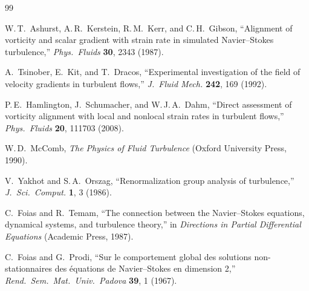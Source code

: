 \documentclass[12pt,a4paper]{article}
\begin{document}
\begin{thebibliography}{99}

W.\,T.\ Ashurst, A.\,R.\ Kerstein, R.\,M.\ Kerr, and C.\,H.\ Gibson,
``Alignment of vorticity and scalar gradient with strain rate in simulated Navier--Stokes turbulence,''
\emph{Phys.\ Fluids} \textbf{30}, 2343 (1987).

A.\ Tsinober, E.\ Kit, and T.\ Dracos,
``Experimental investigation of the field of velocity gradients in turbulent flows,''
\emph{J.\ Fluid Mech.} \textbf{242}, 169 (1992).

P.\,E.\ Hamlington, J.\ Schumacher, and W.\,J.\,A.\ Dahm,
``Direct assessment of vorticity alignment with local and nonlocal strain rates in turbulent flows,''
\emph{Phys.\ Fluids} \textbf{20}, 111703 (2008).

W.\,D.\ McComb,
\emph{The Physics of Fluid Turbulence}
(Oxford University Press, 1990).

V.\ Yakhot and S.\,A.\ Orszag,
``Renormalization group analysis of turbulence,''
\emph{J.\ Sci.\ Comput.} \textbf{1}, 3 (1986).

C.\ Foias and R.\ Temam,
``The connection between the Navier--Stokes equations, dynamical systems, and turbulence theory,''
in \emph{Directions in Partial Differential Equations} (Academic Press, 1987).

C.\ Foias and G.\ Prodi,
``Sur le comportement global des solutions non-stationnaires des \'equations de Navier--Stokes en dimension 2,''
\emph{Rend.\ Sem.\ Mat.\ Univ.\ Padova} \textbf{39}, 1 (1967).

\end{thebibliography}
\end{document}
